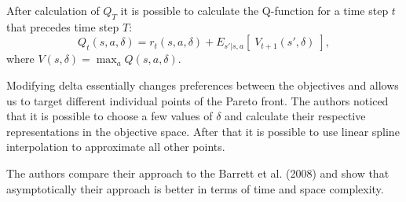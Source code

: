 After calculation of $ Q_{T} $ it is possible to calculate the Q-function for a time step $ t $ that precedes time step $ T $:
$$ Q_{t}(s,a,\delta) = r_{t}(s,a,\delta) + E_{s'|s,a} \left[\; V_{t+1}(s',\delta)\;\right], $$
where $ V(s,\delta) = \max_a Q(s,a,\delta). $

Modifying delta essentially changes preferences between the objectives and allows us to target different individual points of the Pareto front. The authors noticed that it is possible to choose a few values of $ \delta $ and calculate their respective representations in the objective space. After that it is possible to use linear spline interpolation to approximate all other points.

The authors compare their approach to the Barrett et al. (2008)\nocite{barrett2008learning} and show that asymptotically their approach is better in terms of time and space complexity.

























